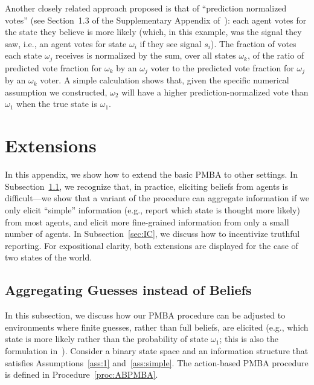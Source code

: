 \documentclass[12pt,reqno]{amsart}
\begin{document}
\begin{example}
Another closely related approach proposed is that of ``prediction normalized votes'' (see Section~1.3 of the Supplementary Appendix of~\cite{prelec2017solution}): each agent votes for the state they believe is more likely (which, in this example, was the signal they saw, i.e., an agent votes for state $\omega_i$ if they see signal $s_i$). The fraction of votes each state $\omega_j$ receives is normalized by the sum, over all states $\omega_k$, of the ratio of predicted vote fraction for $\omega_k$ by an $\omega_j$ voter to the predicted vote fraction for $\omega_j$ by an $\omega_k$ voter. A simple calculation shows that, given the specific numerical assumption we constructed, $\omega_2$ will have a higher prediction-normalized vote than $\omega_1$ when the true state is $\omega_1$.
\end{example}

\section{\texorpdfstring{Extensions}{Extensions}}\label{sec:extensions}

In this appendix, we show how to extend the basic PMBA to other settings. In Subsection~\ref{sec:guesses}, we recognize that, in practice, eliciting beliefs from agents is difficult---we show that a variant of the procedure can aggregate information if we only elicit ``simple'' information (e.g., report which state is thought more likely) from most agents, and elicit more fine-grained information from only a small number of agents. In Subsection~\ref{sec:IC}, we discuss how to incentivize truthful reporting. For expositional clarity, both extensions are displayed for the case of two states of the world.

\subsection{Aggregating Guesses instead of Beliefs}\label{sec:guesses}

In this subsection, we discuss how our PMBA procedure can be adjusted to environments where finite guesses, rather than full beliefs, are elicited (e.g., which state is more likely rather than the probability of state $\omega_1$; this is also the formulation in~\cite{prelec2017solution}). Consider a binary state space and an information structure that satisfies Assumptions~\ref{ass:1} and~\ref{ass:simple}. The action-based PMBA procedure is defined in Procedure~\ref{proc:ABPMBA}.
\end{document}
